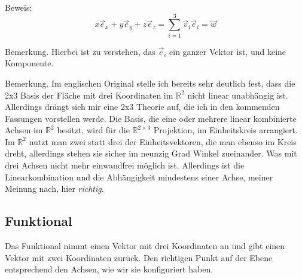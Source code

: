 \documentclass[a4paper]{article}
\begin{document}
Beweis:\\

\begin{displaymath}
x\vec{e}_{x} + y\vec{e}_{y} + z\vec{e}_{z} = \sum_{i=1}^{3}\vec{v}_{i}\vec{e}_{i} = \vec{w} 
\end{displaymath}

Bemerkung. Hierbei ist zu verstehen, das $\vec{e}_{i}$ ein ganzer Vektor ist, und keine Komponente.

Bemerkung. Im englischen Original stelle ich bereits sehr deutlich fest, dass die 2x3 Basis der Fl\"ache mit drei Koordinaten im $\mathbb{R}^{2}$ nicht linear unabh\"angig ist. Allerdings dr\"angt sich mir eine 2x3 Theorie auf, die ich in den kommenden Fassungen vorstellen werde. Die Basis, die eine oder mehrere linear kombinierte Achsen im $\mathbb{R}^{2}$ besitzt, wird f\"ur die $\mathbb{R}^{2\times3}$ Projektion, im Einheitskreis arrangiert. Im $\mathbb{R}^{2}$ nutzt man zwei statt drei der Einheitsvektoren, die man ebenso im Kreis dreht, allerdings stehen sie sicher im neunzig Grad Winkel zueinander. Was mit drei Achsen nicht mehr einwandfrei m\"oglich ist. Allerdings ist die Linearkombination und die Abh\"angigkeit mindestens einer Achse, meiner Meinung nach, hier \emph{richtig}.


\subsection{Funktional}


Das Funktional nimmt einen Vektor mit drei Koordinaten an und gibt einen Vektor mit zwei Koordinaten zur\"uck. 
Den richtigen Punkt auf der Ebene entsprechend den Achsen, wie wir sie konfiguriert haben.\\
\end{document}
